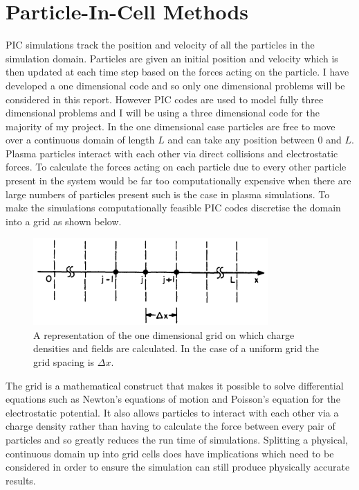 \documentclass[12pt]{article}
\begin{document}
\section{Particle-In-Cell Methods}
PIC simulations track the position and velocity of all the particles in the simulation domain. Particles are given an initial position and velocity which is then updated at each time step based on the forces acting on the particle. I have developed a one dimensional code and so only one dimensional problems will be considered in this report. However PIC codes are used to model fully three dimensional problems and I will be using a three dimensional code for the majority of my project. In the one dimensional case particles are free to move over a continuous domain of length $L$ and can take any position between 0 and $L$. Plasma particles interact with each other via direct collisions and electrostatic forces. To calculate the forces acting on each particle due to every other particle present in the system would be far too computationally expensive when there are large numbers of particles present such is the case in plasma simulations. To make the simulations computationally feasible PIC codes discretise the domain into a grid as shown below.
\begin{figure}[H]
\centering
\includegraphics[width=0.8\textwidth]{grid_1d}
\caption{A representation of the one dimensional grid on which charge densities and fields are calculated. In the case of a uniform grid the grid spacing is $\Delta x$. \cite{bible}}
\label{fig:Leapfrog}
\end{figure}

The grid is a mathematical construct that makes it possible to solve differential equations such as Newton's equations of motion and Poisson's equation for the electrostatic potential. It also allows particles to interact with each other via a charge density rather than having to calculate the force between every pair of particles and so greatly reduces the run time of simulations. Splitting a physical, continuous domain  up into grid cells does have implications which need to be considered in order to ensure the simulation can still produce physically accurate results.
\end{document}
